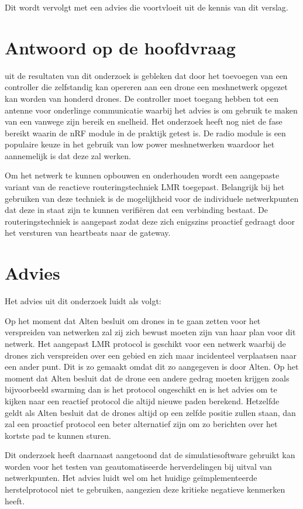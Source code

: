 \documentclass[a4paper, 11pt, oneside]{report}
\begin{document}
Dit wordt vervolgt met een advies die voortvloeit uit de kennis van dit verslag.

\section{Antwoord op de hoofdvraag}

uit de resultaten van dit onderzoek is gebleken dat door het toevoegen van een controller die zelfstandig kan opereren aan een drone een meshnetwerk opgezet kan worden van honderd drones. De controller moet toegang hebben tot een antenne voor onderlinge communicatie waarbij het advies is om gebruik te maken van een  vanwege zijn bereik en snelheid. Het onderzoek heeft nog niet de fase bereikt waarin de nRF module in de praktijk getest is. De radio module is een populaire keuze in het gebruik van low power meshnetwerken waardoor het aannemelijk is dat deze zal werken.

Om het netwerk te kunnen opbouwen en onderhouden wordt een aangepaste variant van de reactieve routeringstechniek LMR toegepast. Belangrijk bij het gebruiken van deze techniek is de mogelijkheid voor de individuele netwerkpunten dat deze in staat zijn te kunnen verifiëren dat een verbinding bestaat. De routeringstechniek is aangepast zodat deze zich enigszins proactief gedraagt door het versturen van heartbeats naar de gateway. 

\section{Advies}
Het advies uit dit onderzoek luidt als volgt:

Op het moment dat Alten besluit om drones in te gaan zetten voor het verspreiden van netwerken zal zij zich bewust moeten zijn van haar plan voor dit netwerk.
Het aangepast LMR protocol is geschikt voor een netwerk waarbij de drones zich verspreiden over een gebied en zich maar incidenteel verplaatsen naar een ander punt.
Dit is zo gemaakt omdat dit zo aangegeven is door Alten.
Op het moment dat Alten besluit dat de drone een andere gedrag moeten krijgen zoals bijvoorbeeld swarming dan is het protocol ongeschikt en is het advies om te kijken naar een reactief protocol die altijd nieuwe paden berekend.
Hetzelfde geldt als Alten besluit dat de drones altijd op een zelfde positie zullen staan, dan zal een proactief protocol een beter alternatief zijn om zo berichten over het kortste pad te kunnen sturen.    

Dit onderzoek heeft daarnaast aangetoond dat de simulatiesoftware gebruikt kan worden voor het testen van geautomatiseerde herverdelingen bij uitval van netwerkpunten. Het advies luidt wel om het huidige geïmplementeerde herstelprotocol niet te gebruiken, aangezien deze kritieke negatieve kenmerken heeft. 
\end{document}
